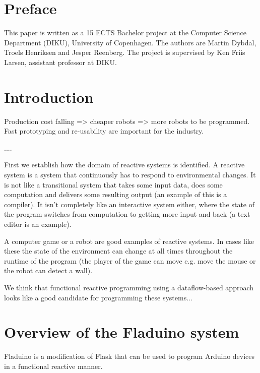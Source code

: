 \documentclass[a4paper, oneside, draft]{memoir}
\begin{document}
\chapter{Preface}
This paper is written as a 15 ECTS Bachelor project at the Computer
Science Department (DIKU), University of Copenhagen. The authors are
Martin Dybdal, Troels Henriksen and Jesper Reenberg. The project is
supervised by Ken Friis Larsen, assistant professor at DIKU.



\chapter{Introduction}
Production cost falling => cheaper robots => more robots to be
programmed. Fast prototyping and re-usability are important for the
industry.

....

First we establish how the domain of reactive systems is identified. A
reactive system is a system that continuously has to respond to
environmental changes. It is not like a transitional system that takes
some input data, does some computation and delivers some resulting
output (an example of this is a compiler). It isn't completely like an
interactive system either, where the state of the program switches
from computation to getting more input and back (a text editor is an
example).  

A computer game or a robot are good examples of reactive systems. In
cases like these the state of the environment can change at all times
throughout the runtime of the program (the player of the game can move
e.g. move the mouse or the robot can detect a wall).

We think that functional reactive programming using a dataflow-based
approach looks like a good candidate for programming these systems...




\chapter{Overview of the Fladuino system}

Fladuino is a modification of Flask that can be used to program
Arduino devices in a functional reactive manner.
\end{document}
